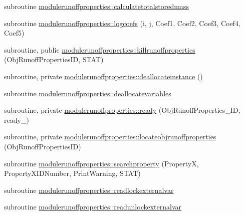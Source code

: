 \begin{DoxyCompactItemize}
subroutine \mbox{\hyperlink{namespacemodulerunoffproperties_a6cac2121fb78c6414c74fdfb38dafcb1}{modulerunoffproperties\+::calculatetotalstoredmass}}
\item 
subroutine \mbox{\hyperlink{namespacemodulerunoffproperties_a951d85579cdd397fac47bf26d3aac4cb}{modulerunoffproperties\+::logcoefs}} (i, j, Coef1, Coef2, Coef3, Coef4, Coef5)
\item 
subroutine, public \mbox{\hyperlink{namespacemodulerunoffproperties_ae0e5362eaddb64340c7e7f7c80f73e3e}{modulerunoffproperties\+::killrunoffproperties}} (Obj\+Runoff\+Properties\+ID, S\+T\+AT)
\item 
subroutine, private \mbox{\hyperlink{namespacemodulerunoffproperties_a8f7e7b0e3044653a0ff4aaf8ecc56c65}{modulerunoffproperties\+::deallocateinstance}} ()
\item 
subroutine \mbox{\hyperlink{namespacemodulerunoffproperties_a5f6b0b75ea06dc86390d8f5059e913a5}{modulerunoffproperties\+::deallocatevariables}}
\item 
subroutine, private \mbox{\hyperlink{namespacemodulerunoffproperties_a8d87a5f2a053e30ef829a92665e19d06}{modulerunoffproperties\+::ready}} (Obj\+Runoff\+Properties\+\_\+\+ID, ready\+\_\+)
\item 
subroutine, private \mbox{\hyperlink{namespacemodulerunoffproperties_adf7480277becbdd9d386b2941df91200}{modulerunoffproperties\+::locateobjrunoffproperties}} (Obj\+Runoff\+Properties\+ID)
\item 
subroutine \mbox{\hyperlink{namespacemodulerunoffproperties_ab2a49fca4ff961c8b2dfd016b005ed06}{modulerunoffproperties\+::searchproperty}} (PropertyX, Property\+X\+I\+D\+Number, Print\+Warning, S\+T\+AT)
\item 
subroutine \mbox{\hyperlink{namespacemodulerunoffproperties_a281dc2c8e1ac168295c6bbff10a4bf54}{modulerunoffproperties\+::readlockexternalvar}}
\item 
subroutine \mbox{\hyperlink{namespacemodulerunoffproperties_abc9cf8901e71a0c3d3b26dd7b5414361}{modulerunoffproperties\+::readunlockexternalvar}}
\end{DoxyCompactItemize}
